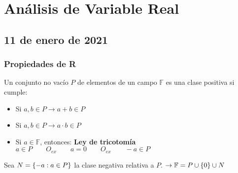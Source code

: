 \setchapterpreamble[u]{\margintoc}
\chapter{Análisis de Variable Real}

\section{11 de enero de 2021}
\subsection{Propiedades de R}

\begin{definition}
Un conjunto no vacío $P$ de elementos de un campo $\mathbb{F}$ es una clase positiva si cumple: 
\begin{itemize}
    \item Si $a,b\in P\to a+b \in P$
    \item Si $a,b \in P\to a\cdot b \in P$
    \item Si $a\in\mathbb{F}$, entonces:\newline
    \textbf{Ley de tricotomía}\newline
    $a\in P\quad\quad  O_{ex} \quad\quad  a=0 \quad\quad  O_{ex} \quad\quad  -a\in P$ 
\end{itemize}
\end{definition}
\begin{remark}
Sea $N=\{-a: a\in P\}$ la clase negativa relativa a $P$. $\to \mathbb{F}= P\cup \{0\}\cup N$
\end{remark}

